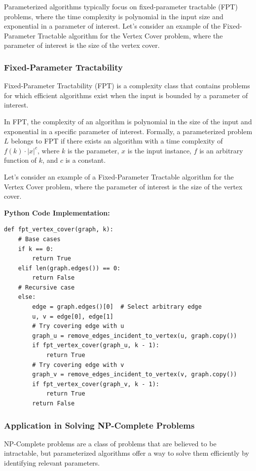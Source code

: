 Parameterized algorithms typically focus on fixed-parameter tractable (FPT) problems, where the time complexity is polynomial in the input size and exponential in a parameter of interest. Let's consider an example of the Fixed-Parameter Tractable algorithm for the Vertex Cover problem, where the parameter of interest is the size of the vertex cover.

\subsubsection{Fixed-Parameter Tractability}

Fixed-Parameter Tractability (FPT) is a complexity class that contains problems for which efficient algorithms exist when the input is bounded by a parameter of interest.

In FPT, the complexity of an algorithm is polynomial in the size of the input and exponential in a specific parameter of interest. Formally, a parameterized problem \(L\) belongs to FPT if there exists an algorithm with a time complexity of \(f(k) \cdot |x|^c\), where \(k\) is the parameter, \(x\) is the input instance, \(f\) is an arbitrary function of \(k\), and \(c\) is a constant.

Let's consider an example of a Fixed-Parameter Tractable algorithm for the Vertex Cover problem, where the parameter of interest is the size of the vertex cover.

\textbf{Python Code Implementation:}
\FloatBarrier
\begin{lstlisting}
def fpt_vertex_cover(graph, k):
    # Base cases
    if k == 0:
        return True
    elif len(graph.edges()) == 0:
        return False
    # Recursive case
    else:
        edge = graph.edges()[0]  # Select arbitrary edge
        u, v = edge[0], edge[1]
        # Try covering edge with u
        graph_u = remove_edges_incident_to_vertex(u, graph.copy())
        if fpt_vertex_cover(graph_u, k - 1):
            return True
        # Try covering edge with v
        graph_v = remove_edges_incident_to_vertex(v, graph.copy())
        if fpt_vertex_cover(graph_v, k - 1):
            return True
        return False
\end{lstlisting}
\FloatBarrier


\subsubsection{Application in Solving NP-Complete Problems}

NP-Complete problems are a class of problems that are believed to be intractable, but parameterized algorithms offer a way to solve them efficiently by identifying relevant parameters.


